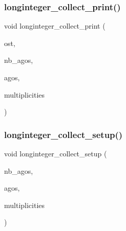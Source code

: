 \subsubsection{\texorpdfstring{longinteger\+\_\+collect\+\_\+print()}{longinteger\_collect\_print()}}
{\footnotesize\ttfamily void longinteger\+\_\+collect\+\_\+print (\begin{DoxyParamCaption}\item[{ostream \&}]{ost,  }\item[{\mbox{\hyperlink{galois_8h_a09fddde158a3a20bd2dcadb609de11dc}{I\+NT}} \&}]{nb\+\_\+agos,  }\item[{\mbox{\hyperlink{classlonginteger__object}{longinteger\+\_\+object}} $\ast$\&}]{agos,  }\item[{\mbox{\hyperlink{galois_8h_a09fddde158a3a20bd2dcadb609de11dc}{I\+NT}} $\ast$\&}]{multiplicities }\end{DoxyParamCaption})}

\mbox{\label{longinteger__domain_8_c_aa70667f6d81325e56b8a7686d19839e7}} 
\subsubsection{\texorpdfstring{longinteger\+\_\+collect\+\_\+setup()}{longinteger\_collect\_setup()}}
{\footnotesize\ttfamily void longinteger\+\_\+collect\+\_\+setup (\begin{DoxyParamCaption}\item[{\mbox{\hyperlink{galois_8h_a09fddde158a3a20bd2dcadb609de11dc}{I\+NT}} \&}]{nb\+\_\+agos,  }\item[{\mbox{\hyperlink{classlonginteger__object}{longinteger\+\_\+object}} $\ast$\&}]{agos,  }\item[{\mbox{\hyperlink{galois_8h_a09fddde158a3a20bd2dcadb609de11dc}{I\+NT}} $\ast$\&}]{multiplicities }\end{DoxyParamCaption})}

\mbox{\label{longinteger__domain_8_c_a6160ced6b3ffc2765c111f7d4f94ed42}} 
